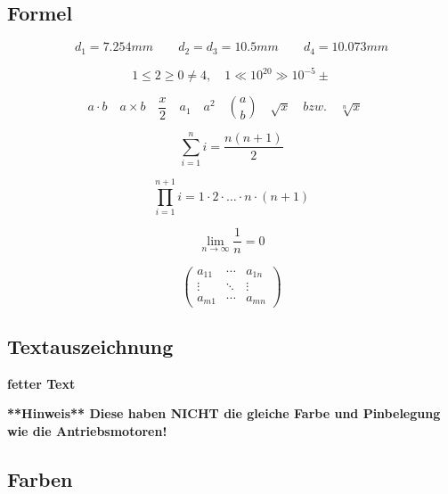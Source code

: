 \subsection{Formel}
\label{formel}

\begin{equation}
	d_1 = 7.254 mm \qquad d_2 = d_3 = 10.5 mm \qquad d_4 = 10.073 mm
\end{equation}

\begin{equation}
	1 \le 2 \ge 0 \neq 4, \quad 1 \ll 10^{20} \gg 10^{-5} \pm 
\end{equation}

\begin{equation}
	a \cdot b \quad
	a \times b \quad
	\frac x2 \quad
	a_1 \quad
	a^2 \quad
	\binom{a}{b} \quad
	\sqrt{x} \quad bzw. \quad \sqrt[n]{x} \quad	
\end{equation}

\begin{equation}
	\sum \limits_{i=1}^n i = \frac{n(n+1)}{2}
\end{equation}

\begin{equation}
	\prod \limits_{i=1}^{n+1}i = 1\cdot 2\cdot\dots\cdot n\cdot (n+1)
\end{equation}

\begin{equation}
	\lim\limits_{n \to \infty}\frac{1}{n}=0
\end{equation}

\begin{equation}
	\left(
		\begin{array}{ccc}
			a_{11} & \cdots & a_{1n} \\
			\vdots & \ddots & \vdots \\
			a_{m1} & \cdots & a_{mn}
		\end{array}
	\right)	
\end{equation}

\subsection{Textauszeichnung}
\label{textauszeichnung}

\textbf{fetter Text}

\textbf{**Hinweis** Diese haben NICHT die gleiche Farbe und Pinbelegung wie die Antriebsmotoren!}


\subsection{Farben}
\label{farben}

